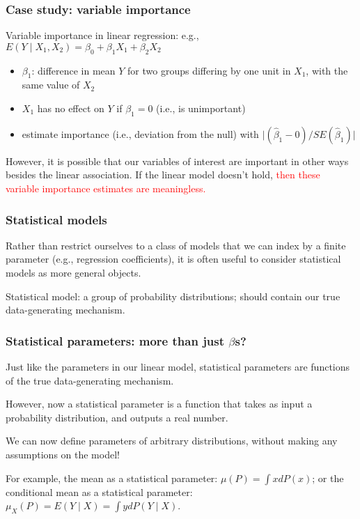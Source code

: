\documentclass[12pt, 
hyperref={colorlinks=true, linkcolor=blue, urlcolor=cyan}]{beamer}
\begin{document}
\begin{frame}
\frametitle{Case study: variable importance}
Variable importance in linear regression: e.g., $E(Y \mid X_1, X_2) = \beta_0 + \beta_1 X_1 + \beta_2 X_2$
\begin{itemize}
\item $\beta_1$: difference in mean $Y$ for two groups differing by one unit in $X_1$, with the same value of $X_2$
\item $X_1$ has no effect on $Y$ if $\beta_1 = 0$ (i.e., is unimportant)
\item estimate importance (i.e., deviation from the null) with $\lvert (\hat{\beta}_1 - 0)/SE(\hat{\beta}_1) \rvert$
\end{itemize}

However, it is possible that our variables of interest are important in other ways besides the linear association. If the linear model doesn't hold, \textcolor{red}{then these variable importance estimates are meaningless.}
\end{frame}

\begin{frame}
\frametitle{Statistical models}
Rather than restrict ourselves to a class of models that we can index by a finite parameter (e.g., regression coefficients), it is often useful to consider statistical models as more general objects.

Statistical model: a group of probability distributions; should contain our true data-generating mechanism.

\begin{tikzpicture}

\end{tikzpicture}

\end{frame}

\begin{frame}
\frametitle{Statistical parameters: more than just $\beta$s?}
Just like the parameters in our linear model, statistical parameters are functions of the true data-generating mechanism.

However, now a statistical parameter is a function that takes as input a probability distribution, and outputs a real number.

We can now define parameters of arbitrary distributions, without making any assumptions on the model!

For example, the mean as a statistical parameter: $\mu(P) = \int x dP(x)$; or the conditional mean as a statistical parameter: $\mu_X(P) = E(Y \mid X) = \int y dP(Y \mid X)$.
\end{frame}
\end{document}
